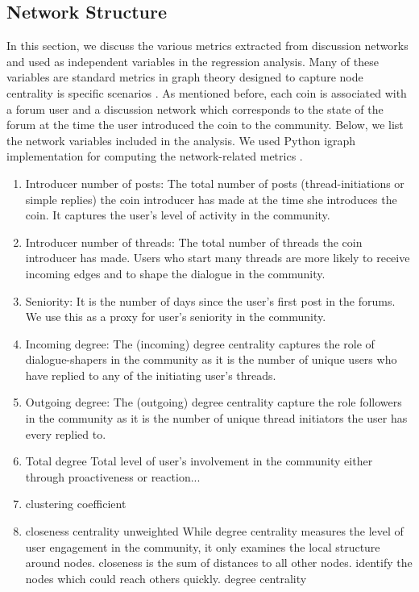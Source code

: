 \subsection{Network Structure}
In this section, we discuss the various metrics extracted from discussion networks and used as independent variables in the regression analysis. Many of these variables are standard metrics in graph theory designed to capture node centrality is specific scenarios \cite{KleinbergNetworks}. As mentioned before, each coin is associated with a forum user and a discussion network which corresponds to the state of the forum at the time the user introduced the coin to the community. Below, we list the network variables included in the analysis. We used Python igraph implementation for computing the network-related metrics \cite{igraph}.
\begin{enumerate}
  \item{Introducer number of posts:} The total number of posts (thread-initiations or simple replies) the coin introducer has made at the time she introduces the coin. It captures the user's level of activity in the community.
  \item{Introducer number of threads:} The total number of threads the coin introducer has made. Users who start many threads are more likely to receive incoming edges and to shape the dialogue in the community.
  \item{Seniority:} It is the number of days since the user's first post in the forums. We use this as a proxy for user's seniority in the community.
  \item{Incoming degree:} The (incoming) degree centrality captures the role of dialogue-shapers in the community as it is the number of unique users who have replied to any of the initiating user's threads.
  \item{Outgoing degree:} The (outgoing) degree centrality capture the role followers in the community as it is the number of unique thread initiators the user has every replied to.
  \item{Total degree} Total level of user's involvement in the community either through proactiveness or reaction...
  \item{clustering coefficient} 
  \item{closeness centrality unweighted} While degree centrality measures the level of user engagement in the community, it only examines the local structure around nodes. closeness  is the sum of distances to all other nodes. identify the nodes which could reach others quickly. degree centrality 

\end{enumerate}

